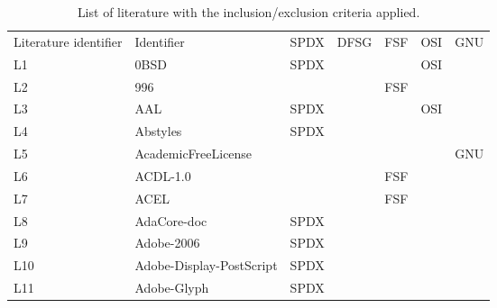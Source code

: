 
\begin{longtable}[h]{m{2cm} | m{7cm} | c | c | c | c | c}
  \caption{List of literature with the inclusion/exclusion criteria applied.} \label{table:appendix:b} \\
  \hline
  Literature identifier & Identifier & SPDX & DFSG & FSF & OSI & GNU \\
  L1 & 0BSD & SPDX &  &  & OSI &  \\
  L2 & 996 &  &  & FSF &  &  \\
  L3 & AAL & SPDX &  &  & OSI &  \\
  L4 & Abstyles & SPDX &  &  &  &  \\
  L5 & AcademicFreeLicense &  &  &  &  & GNU \\
  L6 & ACDL-1.0 &  &  & FSF &  &  \\
  L7 & ACEL &  &  & FSF &  &  \\
  L8 & AdaCore-doc & SPDX &  &  &  &  \\
  L9 & Adobe-2006 & SPDX &  &  &  &  \\
  L10 & Adobe-Display-PostScript & SPDX &  &  &  &  \\
  L11 & Adobe-Glyph & SPDX &  &  &  &  \\
\end{longtable}